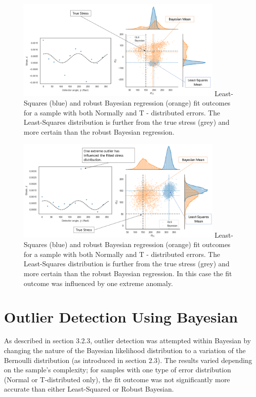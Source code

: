 \begin{figure}[H]
 	\centering
 	\includegraphics[width=0.9\textwidth]{chapters/chapter03/fig03/s93D.png}
 	\mycaption
 	{Least-Squares (blue) and robust Bayesian regression (orange) fit outcomes for a sample with both Normally and T - distributed errors. The Least-Squares distribution is further from the true stress (grey) and more certain than the robust Bayesian regression.}
    \label{fig:RHP02}
 \end{figure}

\begin{figure}[H]
 	\centering
 	\includegraphics[width=0.9\textwidth]{chapters/chapter03/fig03/s103d.png}
 	\mycaption
 	{Least-Squares (blue) and robust Bayesian regression (orange) fit outcomes for a sample with both Normally and T - distributed errors. The Least-Squares distribution is further from the true stress (grey) and more certain than the robust Bayesian regression. In this case the fit outcome was influenced by one extreme anomaly.}
    \label{fig:RHP02}
 \end{figure}


\section{Outlier Detection Using Bayesian}
\label{sec:sec01}

As described in section 3.2.3, outlier detection was attempted within Bayesian by changing the nature of the Bayesian likelihood distribution to a variation of the Bernoulli distribution (as introduced in section 2.3). The results varied depending on the sample's complexity; for samples with one type of error distribution (Normal or T-distributed only), the fit outcome was not significantly more accurate than either Least-Squared or Robust Bayesian. \\

